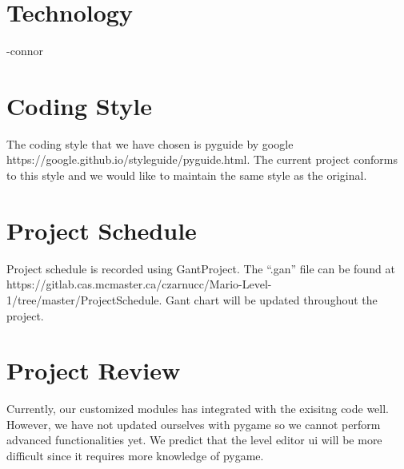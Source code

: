\documentclass{article}
\begin{document}
\section{Technology}
-connor
\section{Coding Style}
The coding style that we have chosen is pyguide by google https://google.github.io/styleguide/pyguide.html. The current project conforms to this style and we would like to maintain the same style as the original.
\section{Project Schedule}
Project schedule is recorded using GantProject. The ``.gan'' file can be found at https://gitlab.cas.mcmaster.ca/czarnucc/Mario-Level-1/tree/master/ProjectSchedule. Gant chart will be updated throughout the project.

\section{Project Review}
Currently, our customized modules has integrated with the exisitng code well. However, we have not updated ourselves with pygame so we cannot perform advanced functionalities yet. We predict that the level editor ui will be more difficult since it requires more knowledge of pygame.
\end{document}
